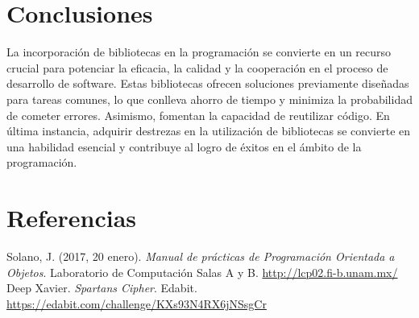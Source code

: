 \documentclass[11pt, twocolumn]{article}
\begin{document}
  \section*{Conclusiones}
  La incorporación de bibliotecas en la programación se convierte en un recurso crucial para potenciar la eficacia, la calidad y la cooperación en el proceso de desarrollo de software. Estas bibliotecas ofrecen soluciones previamente diseñadas para tareas comunes, lo que conlleva ahorro de tiempo y minimiza la probabilidad de cometer errores. Asimismo, fomentan la capacidad de reutilizar código. En última instancia, adquirir destrezas en la utilización de bibliotecas se convierte en una habilidad esencial y contribuye al logro de éxitos en el ámbito de la programación.

  \section*{Referencias}
  \small
  Solano, J. (2017, 20 enero). \textit{Manual de prácticas de Programación Orientada a Objetos}. Laboratorio de Computación Salas A y B. \url{http://lcp02.fi-b.unam.mx/} \\

  Deep Xavier. \textit{Spartans Cipher}. Edabit. \url{https://edabit.com/challenge/KXs93N4RX6jNSsgCr}
\end{document}
